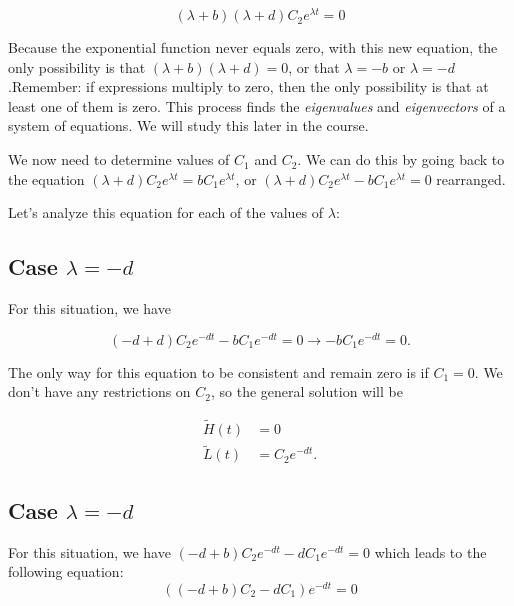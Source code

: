 \documentclass[
]{book}
\theoremstyle{definition}
\theoremstyle{definition}
\theoremstyle{definition}
\theoremstyle{remark}
\begin{document}
\begin{equation}
(\lambda +b) (\lambda +d) C_{2} e^{\lambda t}  = 0
\end{equation}

Because the exponential function never equals zero, with this new equation, the only possibility is that \((\lambda + b)(\lambda + d)=0\), or that \(\lambda = -b\) or \(\lambda = -d\).Remember: if expressions multiply to zero, then the only possibility is that at least one of them is zero. This process finds the \emph{eigenvalues} and \emph{eigenvectors} of a system of equations. We will study this later in the course.

We now need to determine values of \(C_{1}\) and \(C_{2}\). We can do this by going back to the equation \((\lambda + d) C_{2} e^{\lambda t} =b C_{1} e^{\lambda t}\), or \((\lambda + d) C_{2} e^{\lambda t} -b C_{1} e^{\lambda t}=0\) rearranged.

Let's analyze this equation for each of the values of \(\lambda\):

\hypertarget{case-lambda--d}{%
\subsection{\texorpdfstring{Case \(\lambda = -d\)}{Case \textbackslash lambda = -d}}\label{case-lambda--d}}

For this situation, we have

\[(-d +d) C_{2} e^{-d t} - b  C_{1} e^{-d t} =0 \rightarrow   -b  C_{1} e^{-d t} =0.\]

The only way for this equation to be consistent and remain zero is if \(C_{1}=0\). We don't have any restrictions on \(C_{2}\), so the general solution will be

\begin{align}
\tilde{H}(t) &=0 \\
\tilde{L}(t) &= C_{2} e^{-d t}.
\end{align}

\hypertarget{case-lambda--d-1}{%
\subsection{\texorpdfstring{Case \(\lambda = -d\)}{Case \textbackslash lambda = -d}}\label{case-lambda--d-1}}

For this situation, we have \((-d +b) C_{2} e^{-d t} - d C_{1} e^{-d t} =0\) which leads to the following equation:
\begin{equation}
\left( (-d +b) C_{2} - d  C_{1} \right) e^{-d t} =0
\end{equation}
\end{document}
